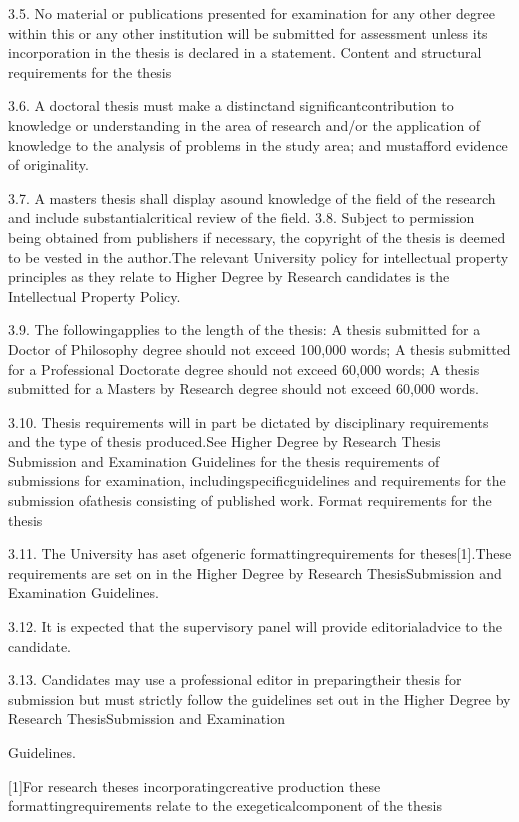 3.5. No material or publications presented for examination for any other degree within this or any other
institution will be submitted for assessment unless its incorporation in the thesis is declared in a
statement.
Content and structural requirements for the thesis

3.6. A doctoral thesis must make a distinctand significantcontribution to knowledge or understanding
in the area of research and/or the application of knowledge to the analysis of problems in the study area;
and mustafford evidence of originality.

3.7. A masters thesis shall display asound knowledge of the field of the research and include
substantialcritical review of the field.
3.8. Subject to permission being obtained from publishers if necessary, the copyright of the thesis is
deemed to be vested in the author.The relevant University policy for intellectual property principles as
they relate to Higher Degree by Research candidates is the Intellectual Property Policy.

3.9. The followingapplies to the length of the thesis:
A thesis submitted for a Doctor of Philosophy degree should not exceed 100,000 words;
A thesis submitted for a Professional Doctorate degree should not exceed 60,000 words;
A thesis submitted for a Masters by Research degree should not exceed 60,000 words.

3.10. Thesis requirements will in part be dictated by disciplinary requirements and the type of thesis
produced.See Higher Degree by Research Thesis Submission and Examination Guidelines for the thesis
requirements of submissions for examination, includingspecificguidelines and requirements for the
submission ofathesis consisting of published work.
Format requirements for the thesis

3.11. The University has aset ofgeneric formattingrequirements for theses{[}1{]}.These requirements are
set on in the Higher Degree by Research ThesisSubmission and Examination Guidelines.

3.12. It is expected that the supervisory panel will provide editorialadvice to the candidate.

3.13. Candidates may use a professional editor in preparingtheir thesis for submission but must strictly
follow the guidelines set out in the Higher Degree by Research ThesisSubmission and Examination

Guidelines.

{[}1{]}For research theses incorporatingcreative production these formattingrequirements relate to the
exegeticalcomponent of the thesis

